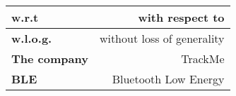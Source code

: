 \renewcommand{\arraystretch}{1.5}
\begin{center}
    \begin{tabular}{|l|r|}
        \hline
        \textbf{w.r.t} & with respect to  \\
        \hline
        \textbf{w.l.o.g.} & without loss of generality \\
        \hline
        \textbf{The company} & TrackMe \\
        \hline
        \textbf{BLE} & Bluetooth Low Energy \\
        \hline
    \end{tabular}
\end{center}